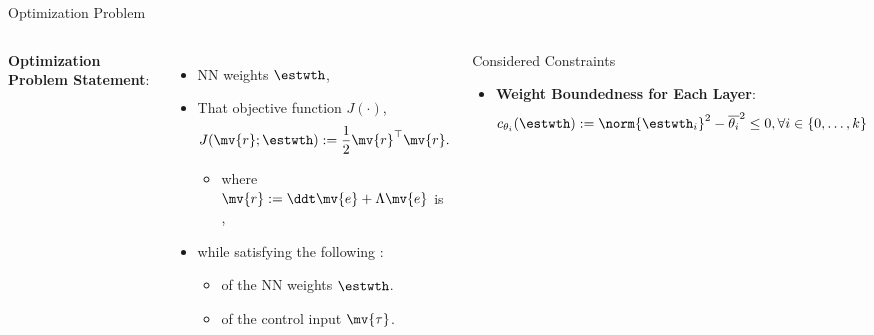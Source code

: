 \documentclass[8pt, aspectratio=169]{beamer}
\newcommand{\ctxt}[2]{\color{#1}{#2}\color{black}}
\begin{document}
\begin{frame}{\insertsubsectionhead}{Optimization Problem}

\begin{columns}


    \textbf{Optimization Problem Statement}:

    \begin{itemize}
      \item \ctxt{awesome}{Find } NN weights $\estwth$,
      \item That \ctxt{airforceblue}{minimize } objective function $J(\cdot)$,
        \begin{equation}\label{eq:obj}
          J(\mv{r};\estwth)
          := 
          \frac{1}{2} \mv{r}^\top \mv{r}.
        \end{equation}
        \begin{itemize}
          \item where $\mv{r} := \ddt\mv{e} + \Lambda\mv{e}$ is \ctxt{awesome}{filtered tracking error},
        \end{itemize}
      \item while satisfying the following \ctxt{awesome}{constraints}:
        \begin{itemize}
          \item \ctxt{airforceblue}{Boundedness } of the NN weights $\estwth$.
          \item \ctxt{airforceblue}{Saturation } of the control input $\mv{\tau}$.
        \end{itemize}
    \end{itemize}

  

  {
    \begin{block}{Considered Constraints}

      \begin{itemize}
        \item \textbf{Weight Boundedness for Each Layer}: 
          \begin{equation}\label{eq:cstr:weight}
            c_{\theta_i}(\estwth)
            :=
            \norm{\estwth_i}^2 - \overline{\theta_i}^2 \le 0
            , 
            \forall i\in\{0,\ldots,k\}
          \end{equation}


\end{itemize}
\end{block}}
\end{columns}
\end{frame}
\end{document}
